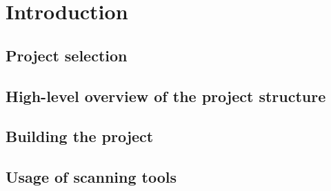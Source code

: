 
\section{Introduction}

\subsection{Project selection}

\subsection{High-level overview of the project structure}

\subsection{Building the project}

\subsection{Usage of scanning tools}

